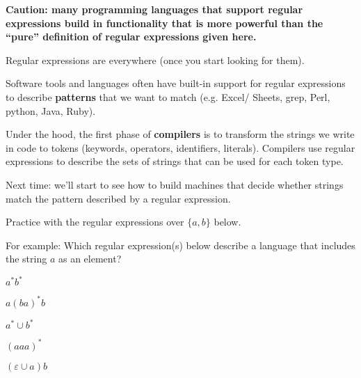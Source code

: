 \documentclass[12pt, oneside]{article}
\begin{document}
\vfill 

{\bf Caution: many programming languages that support regular expressions build in functionality
that is more powerful than the ``pure'' definition of regular expressions given here. }

Regular expressions are everywhere (once you start looking for them).

Software tools and languages often have built-in support for regular expressions to describe
{\bf patterns} that we want to match (e.g. Excel/ Sheets, grep, Perl, python, Java, Ruby).

Under the hood, the first phase of {\bf compilers} is to transform the strings we write 
in code to tokens (keywords, operators, identifiers, literals). Compilers use regular expressions
to describe the sets of strings that can be used for each token type.

Next time: we'll start to see how to build machines that decide whether strings match the pattern
described by a regular expression.

\newpage

Practice with the regular expressions over $\{a,b\}$ below.

For example: Which regular expression(s) below describe a language that includes the string $a$ as an element?

$a^* b^*$ 

\vfill

$a(ba)^* b$

\vfill

$a^* \cup b^*$

\vfill

$(aaa)^*$

\vfill

$(\varepsilon \cup a) b$

\vfill \vfill
\end{document}
